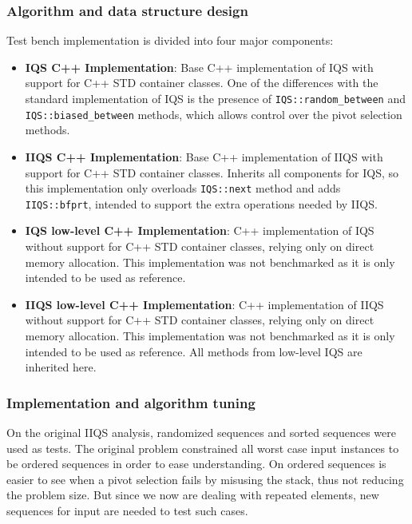 \subsubsection{Algorithm and data structure design}
Test bench implementation is divided into four major components:\\

\begin{itemize}
    \item{
        \textbf{IQS C++ Implementation}: Base C++ implementation of IQS with support for C++ STD container classes. One of the differences with the standard implementation of IQS is the presence of \texttt{IQS::random\_between} and \texttt{IQS::biased\_between} methods, which allows control over the pivot selection methods.
    }
    \item{
        \textbf{IIQS C++ Implementation}: Base C++ implementation of IIQS with support for C++ STD container classes. Inherits all components for IQS, so this implementation only overloads \texttt{IQS::next} method and adds \texttt{IIQS::bfprt}, intended to support the extra operations needed by IIQS.
    }
    \item{
        \textbf{IQS low-level C++ Implementation}: C++ implementation of IQS without support for C++ STD container classes, relying only on direct memory allocation. This implementation was not benchmarked as it is only intended to be used as reference.
    }
    \item{
        \textbf{IIQS low-level C++ Implementation}: C++ implementation of IIQS without support for C++ STD container classes, relying only on direct memory allocation. This implementation was not benchmarked as it is only intended to be used as reference. All methods from low-level IQS are inherited here.
    }
\end{itemize}

\subsubsection{Implementation and algorithm tuning}
On the original IIQS analysis, randomized sequences and sorted sequences were used as tests. The original problem constrained all worst case input instances to be ordered sequences in order to ease understanding. On ordered sequences is easier to see when a pivot selection fails by misusing the stack, thus not reducing the problem size. But since we now are dealing with repeated elements, new sequences for input are needed to test such cases.\\

